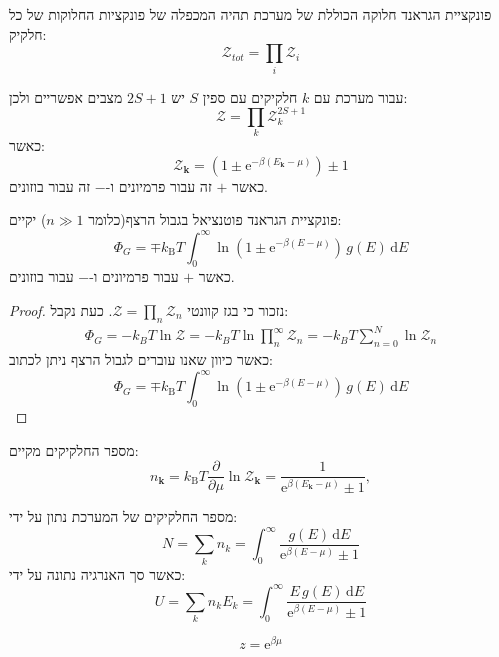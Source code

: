 \documentclass{tstextbook}
\begin{document}
\begin{proposition}
פונקציית הגראנד חלוקה הכוללת של מערכת תהיה המכפלה של פונקציות החלוקות של כל חלקיק:
$${\mathcal{Z}}_{t o t}=\prod_{i}{\mathcal{Z}}_{i}$$

\end{proposition}
\begin{example}
עבור מערכת עם \(k\) חלקיקים עם ספין \(S\) יש \(2S+1\) מצבים אפשריים ולכן:
$$\mathcal{Z}=\prod_{k}\mathcal{Z}_{k}^{2S+1}$$
כאשר:
$${\mathcal{Z}}_{\mathbf{k}}=\left(1\pm\mathrm{e}^{-\beta(E_{\mathbf{k}}-\mu)}\right)\pm1$$
כאשר \(+\) זה עבור פרמיונים ו-\(-\) זה עבור בוזונים.

\end{example}
\begin{proposition}
פונקציית הגראנד פוטנציאל בגבול הרצף(כלומר \(n\gg 1\)) יקיים:
$$\Phi_{G}= \mp k_{\mathrm{B}}T\int_{0}^{\infty}\ln\left( 1\pm\mathrm{e}^{-\beta\left( E-\mu \right)} \right)\,g(E)\,\mathrm{d}E $$
כאשר \(+\) עבור פרמיונים ו-\(-\) עבור בוזונים.

\end{proposition}
\begin{proof}
נזכור כי בגז קוונטי \(\mathcal{Z}=\prod_{n}\mathcal{Z}_{n}\). כעת נקבל:
\begin{gather*}\Phi_{G}=-k_{B}T\ln \mathcal{Z} =-k_{B}T\ln \prod_{n}^{\infty}\mathcal{Z} _{n} =-k_{B}T\sum_{n=0}^{N} \ln \mathcal{Z} _{n}
\end{gather*}
כאשר כיוון שאנו עוברים לגבול הרצף ניתן לכתוב:
$$
\Phi_{G}=\mp k_{\mathrm{B}}T\int_{0}^{\infty}\ln\left( 1\pm\mathrm{e}^{-\beta\left( E-\mu \right)} \right)\,g(E)\,\mathrm{d}E $$

\end{proof}
\begin{proposition}
מספר החלקיקים מקיים:
$$n_{\mathbf{k}}=k_{\mathrm{B}}T{\frac{\partial}{\partial\mu}}\ln{\mathcal{Z}}_{\mathbf{k}}={\frac{1}{\mathrm{e}^{\beta(E_{\mathbf{k}}-\mu)}\pm1}},$$

\end{proposition}
\begin{corollary}
מספר החלקיקים של המערכת נתון על ידי:
$$N=\sum_{k}n_{k}=\int_{0}^{\infty}{\frac{g(E)\,\mathrm{d}E}{\mathrm{e}^{\beta(E-\mu)}\pm1}}$$
כאשר סך האנרגיה נתונה על ידי:
$$U=\sum_{k}n_{k}E_{k}=\int_{0}^{\infty}\frac{E\,g(E)\,\mathrm{d}E}{\mathrm{e}^{\beta(E-\mu)}\pm1}$$

\end{corollary}
\begin{definition}
$$z=\mathrm{e}^{\beta\mu}$$

\end{definition}
\end{document}

